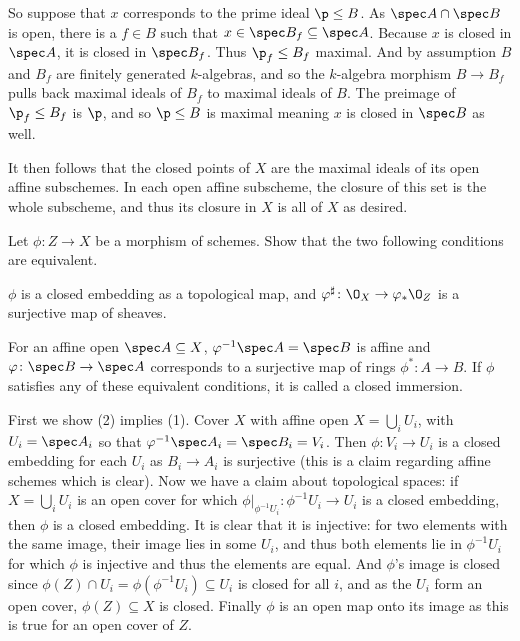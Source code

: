 So suppose that $x$ corresponds to the prime ideal $\p\leq B$.
As $\spec A\cap\spec B$ is open, there is a $f\in B$ such that $x\in\spec B_f\subseteq\spec A$.
Because $x$ is closed in $\spec A$, it is closed in $\spec B_f$.
Thus $\p_f\leq B_f$ maximal.
And by assumption $B$ and $B_f$ are finitely generated $k$-algebras, and so the $k$-algebra morphism $B\to B_f$ pulls back maximal ideals of $B_f$
to maximal ideals of $B$.
The preimage of $\p_f\leq B_f$ is $\p$, and so $\p\leq B$ is maximal meaning $x$ is closed in $\spec B$ as well.

It then follows that the closed points of $X$ are the maximal ideals of its open affine subschemes.
In each open affine subscheme, the closure of this set is the whole subscheme, and thus its closure in $X$ is all of $X$ as desired.

\bprob

    Let $\phi\colon Z\to X$ be a morphism of schemes.
    Show that the two following conditions are equivalent.
    \benum
        \item $\phi$ is a closed embedding as a topological map, and $\phi^\sharp\colon\O_X\to\phi_*\O_Z$ is a surjective map of sheaves.
        \item For an affine open $\spec A\subseteq X$, $\phi^{-1}\spec A=\spec B$ is affine and $\phi\colon\spec B\to\spec A$ corresponds to
        a surjective map of rings $\phi^*\colon A\to B$.
    \eenum
    If $\phi$ satisfies any of these equivalent conditions, it is called a {\emphcolor closed immersion}.

\eprob

First we show (2) implies (1).
Cover $X$ with affine open $X=\bigcup_iU_i$, with $U_i=\spec A_i$ so that $\phi^{-1}\spec A_i=\spec B_i=V_i$.
Then $\phi\colon V_i\to U_i$ is a closed embedding for each $U_i$ as $B_i\to A_i$ is surjective (this is a claim regarding affine schemes which is clear).
Now we have a claim about topological spaces: if $X=\bigcup_iU_i$ is an open cover for which $\phi|_{\phi^{-1}U_i}\colon \phi^{-1}U_i\to U_i$ is a closed embedding,
then $\phi$ is a closed embedding.
It is clear that it is injective: for two elements with the same image, their image lies in some $U_i$, and thus both elements lie in $\phi^{-1}U_i$ for which
$\phi$ is injective and thus the elements are equal.
And $\phi$'s image is closed since $\phi(Z)\cap U_i=\phi(\phi^{-1}U_i)\subseteq U_i$ is closed for all $i$, and as the $U_i$ form an open cover, $\phi(Z)\subseteq X$
is closed.
Finally $\phi$ is an open map onto its image as this is true for an open cover of $Z$.

